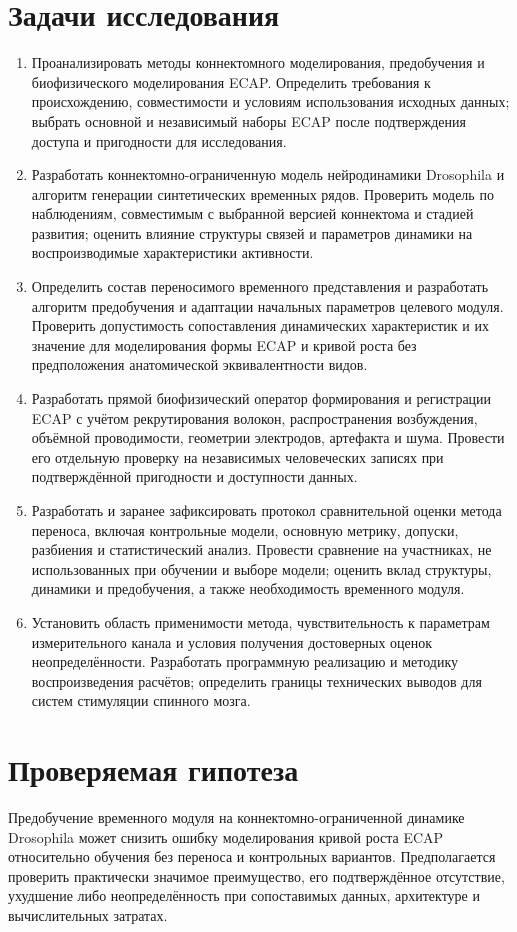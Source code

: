 \section*{Задачи исследования}
\begin{enumerate}
\setlength{\itemsep}{3pt}

\item Проанализировать методы коннектомного моделирования, предобучения и биофизического моделирования ECAP. Определить требования к происхождению, совместимости и условиям использования исходных данных; выбрать основной и независимый наборы ECAP после подтверждения доступа и пригодности для исследования.
\item Разработать коннектомно-ограниченную модель нейродинамики Drosophila и алгоритм генерации синтетических временных рядов. Проверить модель по наблюдениям, совместимым с выбранной версией коннектома и стадией развития; оценить влияние структуры связей и параметров динамики на воспроизводимые характеристики активности.
\item Определить состав переносимого временного представления и разработать алгоритм предобучения и адаптации начальных параметров целевого модуля. Проверить допустимость сопоставления динамических характеристик и их значение для моделирования формы ECAP и кривой роста без предположения анатомической эквивалентности видов.
\item Разработать прямой биофизический оператор формирования и регистрации ECAP с учётом рекрутирования волокон, распространения возбуждения, объёмной проводимости, геометрии электродов, артефакта и шума. Провести его отдельную проверку на независимых человеческих записях при подтверждённой пригодности и доступности данных.
\item Разработать и заранее зафиксировать протокол сравнительной оценки метода переноса, включая контрольные модели, основную метрику, допуски, разбиения и статистический анализ. Провести сравнение на участниках, не использованных при обучении и выборе модели; оценить вклад структуры, динамики и предобучения, а также необходимость временного модуля.
\item Установить область применимости метода, чувствительность к параметрам измерительного канала и условия получения достоверных оценок неопределённости. Разработать программную реализацию и методику воспроизведения расчётов; определить границы технических выводов для систем стимуляции спинного мозга.
\end{enumerate}
\section*{Проверяемая гипотеза}
Предобучение временного модуля на коннектомно-ограниченной динамике Drosophila может снизить ошибку моделирования кривой роста ECAP относительно обучения без переноса и контрольных вариантов. Предполагается проверить практически значимое преимущество, его подтверждённое отсутствие, ухудшение либо неопределённость при сопоставимых данных, архитектуре и вычислительных затратах.
